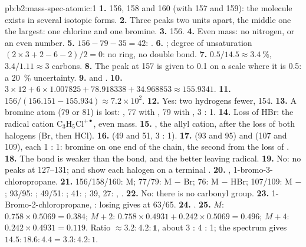 \begin{solution}{pb:b2:mass-spec-atomic:1}
\textbf{1.} 156, 158 and 160 (with 157 and 159): the molecule exists in several isotopic forms.
\textbf{2.} Three peaks two units apart, the middle one the largest: one chlorine and one bromine.
\textbf{3.} 156.
\textbf{4.} Even mass: no nitrogen, or an even number.
\textbf{5.} $156 - 79 - 35 = 42$: .
\textbf{6.} ; degree of unsaturation $(2 \times 3 + 2 - 6 - 2)/2 = 0$: no ring, no double
bond.
\textbf{7.} $0.5/14.5 \approx 3.4~\%$, $3.4/1.11 \approx 3$ carbons.
\textbf{8.} The peak at 157 is given to 0.1 on a scale where it is 0.5: a 20~\% uncertainty.
\textbf{9.}  and .
\textbf{10.} $3 \times 12 + 6 \times 1.007825 + 78.918338 + 34.968853 \approx 155.9341$.
\textbf{11.} $156/(156.151 - 155.934) \approx 7.2 \times 10^2$.
\textbf{12.} Yes: two hydrogens fewer, 154.
\textbf{13.} A bromine atom (79 or 81) is lost: , 77 with , 79 with ,
3 : 1.
\textbf{14.} Loss of HBr: the radical cation $\mathrm{C_3H_5Cl^{+\bullet}}$, even mass.
\textbf{15.} , the allyl cation, after the loss of both halogens (Br, then HCl).
\textbf{16.}  (49 and 51, 3 : 1).
\textbf{17.}  (93 and 95) and  (107 and 109), each 1 : 1: bromine on one end of
the chain, the second from the loss of .
\textbf{18.} The  bond is weaker than the  bond, and  the better leaving
radical.
\textbf{19.} No: no peaks at 127--131;  and  show each halogen on a terminal
.
\textbf{20.} , 1-bromo-3-chloropropane.
\textbf{21.} 156/158/160: M; 77/79: M $-$ Br; 76: M $-$ HBr; 107/109: M $-$ ;
93/95: ; 49/51: ; 41: ; 39, 27: , .
\textbf{22.} No: there is no carbonyl group.
\textbf{23.} 1-Bromo-2-chloropropane, : losing  gives  at 63/65.
\textbf{24.} .
\textbf{25.} $M$: $0.758 \times 0.5069 = 0.384$; $M+2$: $0.758 \times 0.4931 + 0.242 \times 0.5069 =
0.496$; $M+4$: $0.242 \times 0.4931 = 0.119$. Ratio $\boldsymbol{\approx 3.2 : 4.2 : 1}$, about 3 : 4 :
1; the spectrum gives $14.5 : 18.6 : 4.4 = 3.3 : 4.2 : 1$.
\end{solution}
